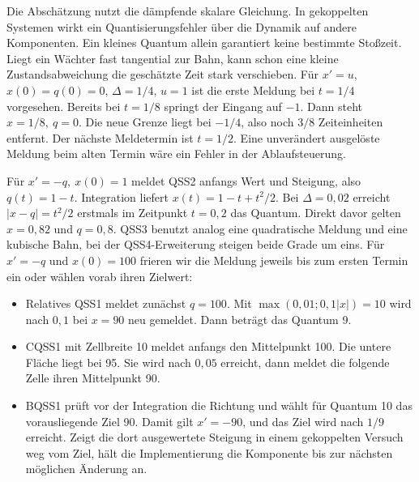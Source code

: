 Die Abschätzung nutzt die dämpfende skalare Gleichung. In gekoppelten Systemen wirkt ein Quantisierungsfehler über die Dynamik auf andere Komponenten. Ein kleines Quantum allein garantiert keine bestimmte Stoßzeit. Liegt ein Wächter fast tangential zur Bahn, kann schon eine kleine Zustandsabweichung die geschätzte Zeit stark verschieben.
Für \(x'=u\), \(x(0)=q(0)=0\), \(\Delta=1/4\), \(u=1\) ist die erste Meldung bei \(t=1/4\) vorgesehen. Bereits bei \(t=1/8\) springt der Eingang auf \(-1\). Dann steht \(x=1/8,\ q=0\). Die neue Grenze liegt bei \(-1/4\), also noch \(3/8\) Zeiteinheiten entfernt. Der nächste Meldetermin ist \(t=1/2\). Eine unverändert ausgelöste Meldung beim alten Termin wäre ein Fehler in der Ablaufsteuerung.

Für \(x'=-q,\ x(0)=1\) meldet QSS2 anfangs Wert und Steigung, also \(q(t)=1-t\). Integration liefert \(x(t)=1-t+t^2/2\). Bei \(\Delta=0{,}02\) erreicht \(|x-q|=t^2/2\) erstmals im Zeitpunkt \(t=0{,}2\) das Quantum. Direkt davor gelten \(x=0{,}82\) und \(q=0{,}8\). QSS3 benutzt analog eine quadratische Meldung und eine kubische Bahn, bei der QSS4-Erweiterung steigen beide Grade um eins.
Für \(x'=-q\) und \(x(0)=100\) frieren wir die Meldung jeweils bis zum ersten Termin ein oder wählen vorab ihren Zielwert:
\begin{itemize}\zerolist
\item Relatives QSS1 meldet zunächst \(q=100\). Mit \(\max(0{,}01;0{,}1|x|)=10\) wird nach \(0{,}1\) bei \(x=90\) neu gemeldet. Dann beträgt das Quantum 9.
\item CQSS1 mit Zellbreite 10 meldet anfangs den Mittelpunkt 100. Die untere Fläche liegt bei 95. Sie wird nach \(0{,}05\) erreicht, dann meldet die folgende Zelle ihren Mittelpunkt 90.
\item BQSS1 prüft vor der Integration die Richtung und wählt für Quantum 10 das vorausliegende Ziel 90. Damit gilt \(x'=-90\), und das Ziel wird nach \(1/9\) erreicht. Zeigt die dort ausgewertete Steigung in einem gekoppelten Versuch weg vom Ziel, hält die Implementierung die Komponente bis zur nächsten möglichen Änderung an.
\end{itemize}

